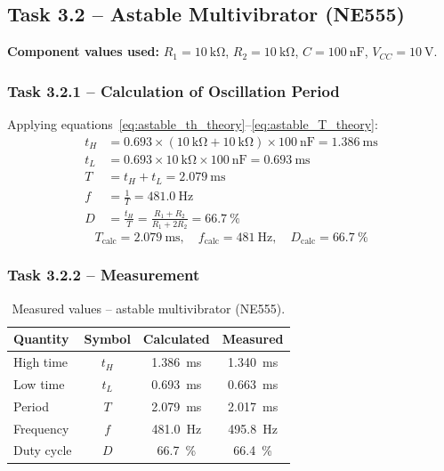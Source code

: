 \documentclass[12pt, a4paper]{article}
\begin{document}
\subsection{Task 3.2 -- Astable Multivibrator (NE555)}

\textbf{Component values used:}
$R_1 = \SI{10}{\kilo\ohm}$,\quad
$R_2 = \SI{10}{\kilo\ohm}$,\quad
$C = \SI{100}{\nano\farad}$,\quad
$V_{CC} = \SI{10}{\volt}$.

\subsubsection{Task 3.2.1 -- Calculation of Oscillation Period}

Applying equations~\eqref{eq:astable_th_theory}--\eqref{eq:astable_T_theory}:
\begin{align*}
  t_H &= 0.693 \times (\SI{10}{\kilo\ohm} + \SI{10}{\kilo\ohm}) \times \SI{100}{\nano\farad}
       = \SI{1.386}{\milli\second} \\
  t_L &= 0.693 \times \SI{10}{\kilo\ohm} \times \SI{100}{\nano\farad}
       = \SI{0.693}{\milli\second} \\
  T   &= t_H + t_L = \SI{2.079}{\milli\second} \\
  f   &= \frac{1}{T} = \SI{481.0}{\hertz} \\
  D   &= \frac{t_H}{T} = \frac{R_1+R_2}{R_1+2R_2} = \SI{66.7}{\percent}
\end{align*}
\[
  \boxed{T_{\text{calc}} = \SI{2.079}{\milli\second}, \quad
         f_{\text{calc}} = \SI{481}{\hertz}, \quad
         D_{\text{calc}} = \SI{66.7}{\percent}}
\]

\subsubsection{Task 3.2.2 -- Measurement}

\begin{table}[H]
  \centering
  \caption{Measured values -- astable multivibrator (NE555).}
  \label{tab:astable_ne555}
  \begin{tabular}{lccc}
    \toprule
    Quantity & Symbol & Calculated & Measured \\
    \midrule
    High time    & $t_H$ & \SI{1.386}{\milli\second} & \SI{1.340}{\milli\second} \\
    Low time     & $t_L$ & \SI{0.693}{\milli\second} & \SI{0.663}{\milli\second} \\
    Period       & $T$   & \SI{2.079}{\milli\second} & \SI{2.017}{\milli\second} \\
    Frequency    & $f$   & \SI{481.0}{\hertz}        & \SI{495.8}{\hertz}        \\
    Duty cycle   & $D$   & \SI{66.7}{\percent}       & \SI{66.4}{\percent}       \\
    \bottomrule
  \end{tabular}
\end{table}
\end{document}
